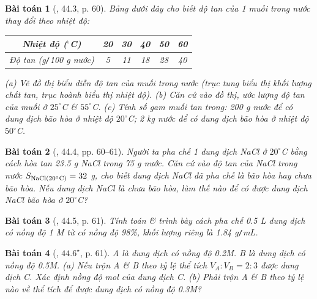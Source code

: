 \documentclass{article}
\newtheorem{baitoan}{Bài toán}
\begin{document}
\begin{baitoan}[\cite{SBT_Hoa_Hoc_8}, 44.3, p. 60]
	Bảng dưới đây cho biết độ tan của 1 muối trong nước thay đổi theo nhiệt độ:
	\begin{table}[H]
		\centering
		\begin{tabular}{|c|c|c|c|c|c|}
			\hline
			Nhiệt độ (${}^\circ$C) & 20 & 30 & 40 & 50 & 60 \\
			\hline
			Độ tan (g\texttt{/}100 g nước) & 5 & 11 & 18 & 28 & 40 \\
			\hline
		\end{tabular}
	\end{table}
	\noindent(a) Vẽ đồ thị biểu diễn độ tan của muối trong nước (trục tung biểu thị khối lượng chất tan, trục hoành biểu thị nhiệt độ). (b) Căn cứ vào đồ thị, ước lượng độ tan của muối ở $25^\circ$\emph{C} \& $55^\circ$\emph{C}. (c) Tính số gam muối tan trong: \emph{200 g} nước để có dung dịch bão hòa ở nhiệt độ $20^\circ$\emph{C}; \emph{2 kg} nước để có dung dịch bão hòa ở nhiệt độ $50^\circ$\emph{C}.
\end{baitoan}

\begin{baitoan}[\cite{SBT_Hoa_Hoc_8}, 44.4, pp. 60--61]
	Người ta pha chế 1 dung dịch \emph{NaCl} ở $20^\circ$\emph{C} bằng cách hòa tan \emph{23.5 g NaCl} trong \emph{75 g} nước. Căn cứ vào độ tan của \emph{NaCl} trong nước $S_{\rm NaCl(20^\circ C)} = 32$ \emph{g}, cho biết dung dịch \emph{NaCl} đã pha chế là bão hòa hay chưa bão hòa. Nếu dung dịch \emph{NaCl} là chưa bão hòa, làm thế nào để có được dung dịch \emph{NaCl} bão hòa ở $20^\circ$\emph{C}?
\end{baitoan}

\begin{baitoan}[\cite{SBT_Hoa_Hoc_8}, 44.5, p. 61]
	Tính toán \& trình bày cách pha chế \emph{0.5 L} dung dịch \emph{} có nồng độ \emph{1 M} từ \emph{} có nồng độ \emph{98\%}, khối lượng riêng là \emph{1.84 g\texttt{/}mL}.
\end{baitoan}

\begin{baitoan}[\cite{SBT_Hoa_Hoc_8}, $44.6^\star$, p. 61]
	A là dung dịch \emph{} có nồng độ \emph{0.2M}. B là dung dịch \emph{} có nồng độ \emph{0.5M}. (a) Nếu trộn A \& B theo tỷ lệ thể tích $V_A:V_B = 2:3$ được dung dịch C. Xác định nồng độ mol của dung dịch C. (b) Phải trộn A \& B theo tỷ lệ nào về thể tích để được dung dịch \emph{} có nồng độ \emph{0.3M}?
\end{baitoan}
\end{document}
